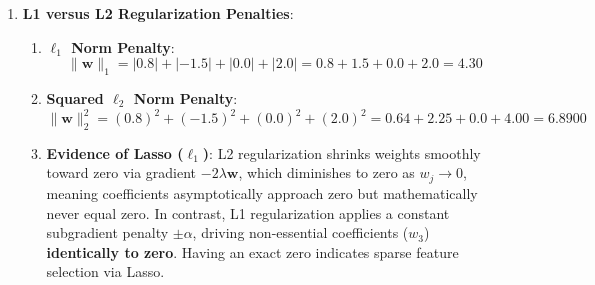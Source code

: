 \begin{enumerate}
\begin{enumerate}[label=(\alph*)]
        \item \textbf{Coefficient of Determination ($R^2$)}:
        Mean target value: $\bar{y} = \frac{100 + 150 + 200 + 250}{4} = 175.0\text{ kW}$.
        \begin{align*}
        \text{SS}_{\text{tot}} &= (100 - 175)^2 + (150 - 175)^2 + (200 - 175)^2 + (250 - 175)^2 \\
        &= (-75)^2 + (-25)^2 + (25)^2 + (75)^2 = 5625 + 625 + 625 + 5625 = \mathbf{12{,}500.0} \\
        \text{SS}_{\text{res}} &= \sum e_i^2 = 550.0 \\
        R^2 &= 1 - \frac{\text{SS}_{\text{res}}}{\text{SS}_{\text{tot}}} = 1 - \frac{550.0}{12{,}500.0} = 1 - 0.0440 = \mathbf{0.9560} \quad (95.60\%)
        \end{align*}
        The model explains $95.60\%$ of the variance in generator power output.
    \end{enumerate}

    \item \textbf{L1 versus L2 Regularization Penalties}:
    \begin{enumerate}[label=(\alph*)]
        \item \textbf{$\ell_1$ Norm Penalty}:
        \begin{equation*}
        \|\mathbf{w}\|_1 = |0.8| + |-1.5| + |0.0| + |2.0| = 0.8 + 1.5 + 0.0 + 2.0 = \mathbf{4.30}
        \end{equation*}

        \item \textbf{Squared $\ell_2$ Norm Penalty}:
        \begin{equation*}
        \|\mathbf{w}\|_2^2 = (0.8)^2 + (-1.5)^2 + (0.0)^2 + (2.0)^2 = 0.64 + 2.25 + 0.0 + 4.00 = \mathbf{6.8900}
        \end{equation*}

        \item \textbf{Evidence of Lasso ($\ell_1$)}:
        L2 regularization shrinks weights smoothly toward zero via gradient $-2\lambda \mathbf{w}$, which diminishes to zero as $w_j \to 0$, meaning coefficients asymptotically approach zero but mathematically never equal zero. In contrast, L1 regularization applies a constant subgradient penalty $\pm \alpha$, driving non-essential coefficients ($w_3$) \textbf{identically to zero}. Having an exact zero indicates sparse feature selection via Lasso.
    \end{enumerate}


\end{enumerate}
